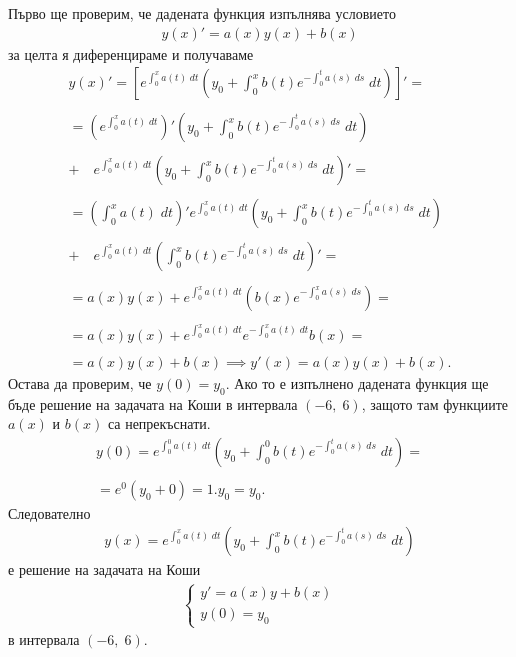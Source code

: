 \documentclass[a4paper, 12pt, oneside]{article}
\begin{document}
Първо ще проверим, че дадената функция изпълнява условието 
\begin{align*}
    y(x)' = a(x)y(x) + b(x)
\end{align*}
за целта я диференцираме и получаваме
\begin{align*}
    y(x)' = \left[e^{\displaystyle\int_0^x a(t) \; dt}\left(y_0 + \displaystyle\int_0^x b(t) e^{-\displaystyle\int_0^t a(s) \; ds} \; dt\right)\right]' = \\\\
    = \left(e^{\displaystyle\int_0^x a(t) \; dt}\right)'\left(y_0 + \displaystyle\int_0^x b(t) e^{-\displaystyle\int_0^t a(s) \; ds} \; dt\right) \\\\
    + \quad e^{\displaystyle\int_0^x a(t) \; dt}\left(y_0 + \displaystyle\int_0^x b(t) e^{-\displaystyle\int_0^t a(s) \; ds} \; dt\right)' = \\\\
    = \left(\displaystyle\int_0^x a(t) \; dt\right)'e^{\displaystyle\int_0^x a(t) \; dt}\left(y_0 + \displaystyle\int_0^x b(t) e^{-\displaystyle\int_0^t a(s) \; ds} \; dt\right) \\\\
    + \quad e^{\displaystyle\int_0^x a(t) \; dt}\left(\displaystyle\int_0^x b(t) e^{-\displaystyle\int_0^t a(s) \; ds} \; dt\right)' = \\\\
    = a(x)y(x) + e^{\displaystyle\int_0^x a(t) \; dt}\left(b(x) e^{-\displaystyle\int_0^x a(s) \; ds}\right) = \\\\
    = a(x)y(x) + e^{\displaystyle\int_0^x a(t) \; dt}e^{-\displaystyle\int_0^x a(t) \; dt} b(x) = \\\\
    = a(x)y(x) + b(x) \implies y'(x) = a(x)y(x) + b(x).
\end{align*}
Остава да проверим, че $y(0) = y_0$. Ако то е изпълнено дадената функция ще бъде решение на задачата на Коши в интервала $(-6, \; 6)$,
защото там функциите $a(x)$ и $b(x)$ са непрекъснати.
\begin{align*}
    y(0) = e^{\displaystyle\int_0^0 a(t) \; dt}\left(y_0 + \displaystyle\int_0^0 b(t) e^{-\displaystyle\int_0^t a(s) \; ds} \; dt\right) = \\\\
    = e^0(y_0 + 0) = 1.y_0 = y_0.
\end{align*}
Следователно \begin{align*}
    y(x) = e^{\displaystyle\int_0^x a(t) \; dt}\left(y_0 + \displaystyle\int_0^x b(t) e^{-\displaystyle\int_0^t a(s) \; ds} \; dt\right)
\end{align*} е решение на задачата на Коши
\begin{align*}
    \begin{cases}
        y' = a(x)y + b(x)\\
        y(0) = y_0
    \end{cases}
\end{align*}
в интервала $(-6, \; 6)$.
\end{document}
